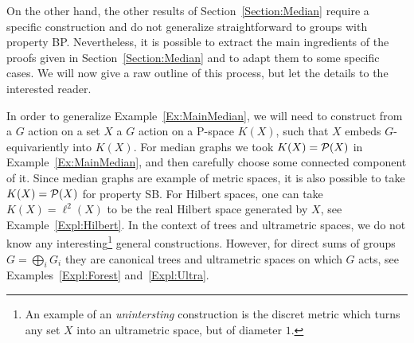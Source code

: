 


On the other hand, the other results of Section~\ref{Section:Median} require a specific construction and do not generalize straightforward to groups with property BP.
Nevertheless, it is possible to extract the main ingredients of the proofs given in Section~\ref{Section:Median} and to adapt them to some specific cases.
We will now give a raw outline of this process, but let the details to the interested reader.

In order to generalize Example~\ref{Ex:MainMedian}, we will need to construct from a $G$ action on a set $X$ a $G$ action on a P-space $K(X)$,
such that $X$ embeds $G$-equivariently into $K(X)$.
For median graphs we took $K(X)=\mathcal P(X)$ in Example~\ref{Ex:MainMedian}, and then carefully choose some connected component of it.
Since median graphs are example of metric spaces, it is also possible to take $K(X)=\mathcal P(X)$ for property SB.
For Hilbert spaces, one can take $K(X)=\ell^2(X)$ to be the real Hilbert space generated by $X$, see Example~\ref{Expl:Hilbert}.
In the context of trees and ultrametric spaces, we do not know any interesting\footnote{An example of an \emph{unintersting} construction is the discret metric which turns any set $X$ into an ultrametric space, but of diameter $1$.} general constructions.
However, for direct sums of groups $G=\bigoplus_i G_i$ they are canonical trees and ultrametric spaces on which $G$ acts, see Examples~\ref{Expl:Forest} and~\ref{Expl:Ultra}.
